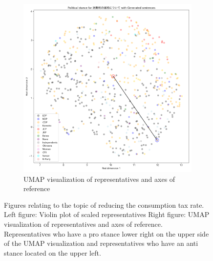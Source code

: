 \documentclass[final,5p,times,twocolumn,authoryear]{elsarticle}
\begin{document}
\begin{figure}[h]
\begin{subfigure}{0.22\textwidth}
      \includegraphics[width=1\linewidth]{figs/results/economy/消費税の減税について_umap_gen.png}
      \caption{UMAP visualization of representatives and axes of reference}
    \end{subfigure}
\caption{Figures relating to the topic of reducing the consumption tax rate. Left figure: Violin plot of scaled representatives Right figure: UMAP visualization of representatives and axes of reference. Representatives who have a pro stance lower right on the upper side of the UMAP visualization and representatives who have an anti stance located on the upper left.}
\label{fig: results-economy-consumption-tax-rate}
\end{figure}
\end{document}
